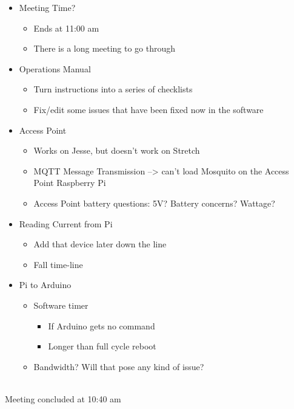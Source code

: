 \documentclass[12pt]{article}
\begin{document}
			\noindent
			\begin{itemize}
				\item Meeting Time?
				\begin{itemize}
					\item Ends at 11:00 am
					\item There is a long meeting to go through
				\end{itemize}
				\item Operations Manual
				\begin{itemize}
					\item Turn instructions into a series of checklists 
					\item Fix/edit some issues that have been fixed now in the software
				\end{itemize}
				\item Access Point
				\begin{itemize}
					\item Works on Jesse, but doesn't work on Stretch
					\item MQTT Message Transmission --> can't load Mosquito on the Access Point Raspberry Pi
					\item Access Point battery questions: 5V? Battery concerns? Wattage?
				\end{itemize}
				\item Reading Current from Pi
				\begin{itemize}
					\item Add that device later down the line
					\item Fall time-line
				\end{itemize}
				\item Pi to Arduino
				\begin{itemize}
					\item Software timer
					\begin{itemize}
						\item If Arduino gets no command
						\item Longer than full cycle reboot
					\end{itemize}
					\item Bandwidth? Will that pose any kind of issue?
				\end{itemize}
			\end{itemize}
		
			\noindent
			\\Meeting concluded at 10:40 am
			
			\clearpage
			
	\newpage
\end{document}

